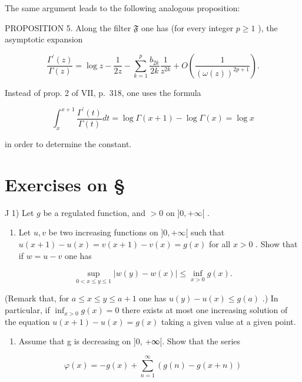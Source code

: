 The same argument leads to the following analogous proposition:

PROPOSITION 5. Along the filter \(\mathfrak{F}\) one has (for every integer \(p \geqslant 1\) ), the asymptotic expansion

\[
\frac {\Gamma^ {\prime} (z)}{\Gamma (z)} = \log z - \frac {1}{2 z} - \sum_ {k = 1} ^ {p} \frac {b _ {2 k}}{2 k} \frac {1}{z ^ {2 k}} + O \left(\frac {1}{(\omega (z)) ^ {2 p + 1}}\right).\tag{26}
\]

Instead of prop. 2 of VII, p.~318, one uses the formula

\[
\int_ {x} ^ {x + 1} \frac {\Gamma^ {\prime} (t)}{\Gamma (t)} d t = \log \Gamma (x + 1) - \log \Gamma (x) = \log x
\]

in order to determine the constant.

\setcounter{exercisegroup}{0}
\section*{Exercises on \S{}}
{}

J 1) Let \(g\) be a regulated function, and \(>0\) on \(]0, +\infty[\) .

\begin{enumerate}
\def\labelenumi{\alph{enumi})}
\tightlist
\item
  Let \(u, v\) be two increasing functions on \(]0, +\infty[\) such that \(u(x + 1) - u(x) = v(x + 1) - v(x) = g(x)\) for all \(x > 0\) . Show that if \(w = u - v\) one has
\end{enumerate}

\[
\sup _ {0 <   x \leqslant y \leqslant 1} | w (y) - w (x) | \leqslant \inf _ {x > 0} g (x).
\]

(Remark that, for \(a \leqslant x \leqslant y \leqslant a + 1\) one has \(u(y) - u(x) \leqslant g(a)\) .) In particular, if \(\inf_{x > 0} g(x) = 0\) there exists at most one increasing solution of the equation \(u(x + 1) - u(x) = g(x)\) taking a given value at a given point.

\begin{enumerate}
\def\labelenumi{\alph{enumi})}
\setcounter{enumi}{1}
\tightlist
\item
  Assume that g is decreasing on {]}0, +∞{[}. Show that the series
\end{enumerate}

\[
\varphi (x) = - g (x) + \sum_ {n = 1} ^ {\infty} (g (n) - g (x + n))
\]

